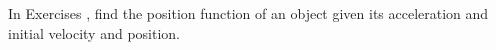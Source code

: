 {\noindent In Exercises}
{ , find the position function of an object given its acceleration and initial velocity and position.
}
